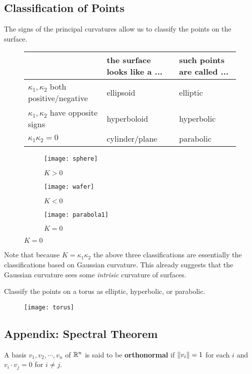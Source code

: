 \subsection{Classification of Points}
The signs of the principal curvatures allow us to classify the points on the surface.
\begin{figure}[H]
	\centering
\begin{tabular}{|l|l|l|}
	\hline
	& the surface looks like a ... & such points are called ...\\ \hline
	$\kappa_1, \kappa_2 $ both positive/negative & ellipsoid &  elliptic \\ \hline
	$\kappa_1, \kappa_2$ have opposite signs & hyperboloid & hyperbolic \\ \hline
	$\kappa_1 \kappa_2 = 0$ & cylinder/plane & parabolic \\\hline
\end{tabular}
\end{figure}
\begin{figure}[H]
  \centering
  \begin{subfigure}[t]{0.30\textwidth}
    \centering
    \texttt{[image: sphere]}
    \caption{$ K > 0$}
  \end{subfigure}
	\begin{subfigure}[t]{0.30\textwidth}
    \centering
    \texttt{[image: wafer]}
    \caption{$ K < 0 $}
  \end{subfigure}
	\begin{subfigure}[t]{0.30\textwidth}
    \centering
    \texttt{[image: parabola1]}
    \caption{$K = 0$}
  \end{subfigure}
\end{figure}
Note that because $K = \kappa_1 \kappa_2$ the above three classifications are essentially the classifications based on Gaussian curvature. This already suggests that the Gaussian curvature sees some \emph{intrisic} curvature of surfaces.\\

\begin{ques}
	Classify the points on a torus as elliptic, hyperbolic, or parabolic.
	\begin{figure}[H]
    \centering
    \texttt{[image: torus]}
  \end{figure}
\end{ques}

\newpage
\subsection{Appendix: Spectral Theorem}
A basis $ v_1, v_2, \cdots, v_n$ of $ \mathbb{R}^n$ is said to be \textbf{orthonormal} if $ \lVert v_i \rVert=1 $ for each $ i$ and $ v_i \cdot v_j = 0$ for $ i \neq j$.


